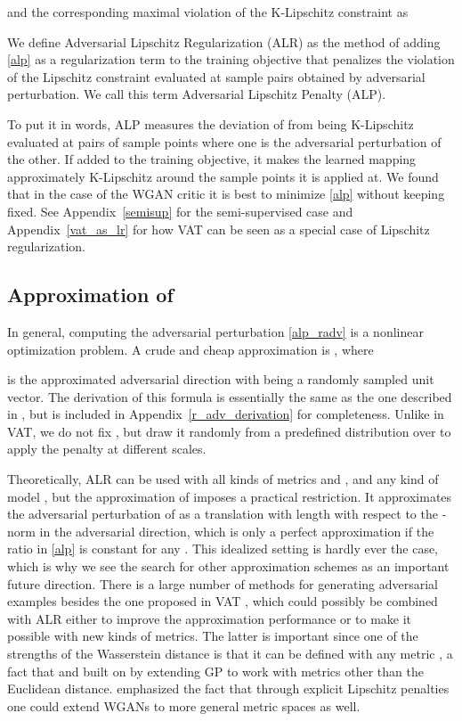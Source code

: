 \documentclass{article}
\begin{document}
and the corresponding maximal violation of the K-Lipschitz constraint as


We define Adversarial Lipschitz Regularization (ALR) as the method of adding \eqref{alp} as a regularization term to the training objective that penalizes the violation of the Lipschitz constraint evaluated at sample pairs obtained by adversarial perturbation. We call this term Adversarial Lipschitz Penalty (ALP).

To put it in words, ALP measures the deviation of  from being K-Lipschitz evaluated at pairs of sample points where one is the adversarial perturbation of the other. If added to the training objective, it makes the learned mapping approximately K-Lipschitz around the sample points it is applied at. We found that in the case of the WGAN critic it is best to minimize \eqref{alp} without keeping  fixed. See Appendix~\ref{semisup} for the semi-supervised case and Appendix~\ref{vat_as_lr} for how VAT can be seen as a special case of Lipschitz regularization.

\subsection{Approximation of }
In general, computing the adversarial perturbation \eqref{alp_radv} is a nonlinear optimization problem. A crude and cheap approximation is , where

is the approximated adversarial direction with  being a randomly sampled unit vector. The derivation of this formula is essentially the same as the one described in \citet{Miyatoetal2017}, but is included in Appendix~\ref{r_adv_derivation} for completeness. Unlike in VAT, we do not fix , but draw it randomly from a predefined distribution  over  to apply the penalty at different scales.

Theoretically, ALR can be used with all kinds of metrics  and , and any kind of model , but the approximation of  imposes a practical restriction. It approximates the adversarial perturbation of  as a translation with length  with respect to the -norm in the adversarial direction, which is only a perfect approximation if the ratio in \eqref{alp} is constant for any . This idealized setting is hardly ever the case, which is why we see the search for other approximation schemes as an important future direction. There is a large number of methods for generating adversarial examples besides the one proposed in VAT \citep{Shafahietal2019, Wongetal2019, Khrulkovetal2018}, which could possibly be combined with ALR either to improve the approximation performance or to make it possible with new kinds of metrics. The latter is important since one of the strengths of the Wasserstein distance is that it can be defined with any metric , a fact that \citet{Adleretal2018} and \citet{Dukleretal2019} built on by extending GP to work with metrics other than the Euclidean distance. \citet{Adleretal2018} emphasized the fact that through explicit Lipschitz penalties one could extend WGANs to more general metric spaces as well.
\end{document}
